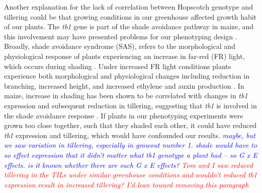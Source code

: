 \documentclass[12pt]{article}
\newcommand{\jri}[1]{\textcolor{blue}{ \emph{\scriptsize  #1}} }
\newcommand{\mbh}[1]{\textcolor{red}{ \emph{\scriptsize  #1}} }
\begin{document}
Another explanation for the lack of correlation between Hopscotch genotype and tillering could be that growing conditions in our greenhouse affected growth habit of our plants. The \emph{tb1} gene is part of the shade avoidance pathway in maize, and this involvement may have presented problems for our phenotyping design \citep{Kebrom and Brutnell 2007}. Broadly, shade avoidance syndrome (SAS), refers to the morphological and physiological response of plants experiencing an increase in far-red (FR) light, which occurs during shading \cite{Kebrom and Brutnell 2007}. Under increased FR light conditions plants experience both morphological and physiological changes including reduction in branching, increased height, and increased ethylene and auxin production \cite{Ballare 1999, Smith and Whitelam 1997}. In maize, increase in shading has been shown to be correlated with changes in \emph{tb1} expression and subsequent reduction in tillering, suggesting that \emph{tb1} is involved in the shade avoidance response \cite{Doebley et al 1997, Lukens and Doebley 1999}. If plants in our phenotyping experiments were grown too close together, such that they shaded each other, it could have reduced \emph{tb1} expression and tillering, which would have confounded our results. \jri{maybe, but we saw variation in tillering, especially in growout number 1. shade would have to so effect expression that it didn't matter what tb1 genotype a plant had -- so G x E effects.  is it known whether there are such G x E effects?} \mbh{Tom and I saw reduced tillering in the TILs under similar greenhouse conditions and wouldn't reduced \emph{tb1} expression result in increased tillering?  I'd lean toward removing this paragraph}
\end{document}

